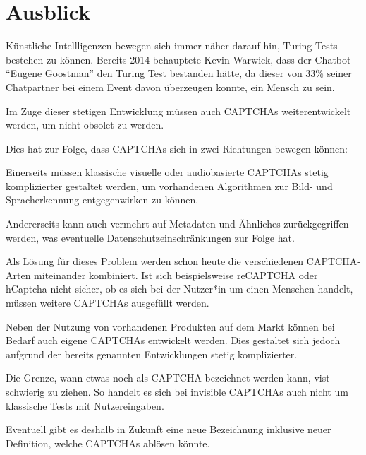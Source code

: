 \chapter{Ausblick}

Künstliche Intellligenzen bewegen sich immer näher darauf hin, Turing Tests bestehen zu können.
Bereits 2014 behauptete Kevin Warwick, dass der Chatbot ``Eugene Goostman'' den Turing Test bestanden hätte,
da dieser von 33\% seiner Chatpartner bei einem Event davon überzeugen konnte, ein Mensch zu sein. \cite{eugene}

Im Zuge dieser stetigen Entwicklung müssen auch CAPTCHAs weiterentwickelt werden,
um nicht obsolet zu werden. 

Dies hat zur Folge, dass CAPTCHAs sich in zwei Richtungen bewegen können:

Einerseits müssen klassische visuelle oder audiobasierte CAPTCHAs stetig komplizierter gestaltet werden,
um vorhandenen Algorithmen zur Bild- und Spracherkennung entgegenwirken zu können.

Andererseits kann auch vermehrt auf Metadaten und Ähnliches zurückgegriffen werden, was eventuelle Datenschutzeinschränkungen zur Folge hat.

Als Lösung für dieses Problem werden schon heute die verschiedenen CAPTCHA-Arten miteinander kombiniert.
Ist sich beispielsweise reCAPTCHA oder hCaptcha nicht sicher, ob es sich bei der Nutzer*in um einen Menschen handelt,
müssen weitere CAPTCHAs ausgefüllt werden.

Neben der Nutzung von vorhandenen Produkten auf dem Markt können bei Bedarf auch eigene CAPTCHAs entwickelt werden.
Dies gestaltet sich jedoch aufgrund der bereits genannten Entwicklungen stetig komplizierter.

Die Grenze, wann etwas noch als CAPTCHA bezeichnet werden kann, vist schwierig zu ziehen.
So handelt es sich bei invisible CAPTCHAs auch nicht um klassische Tests mit Nutzereingaben.

Eventuell gibt es deshalb in Zukunft eine neue Bezeichnung inklusive neuer Definition, welche CAPTCHAs ablösen könnte.